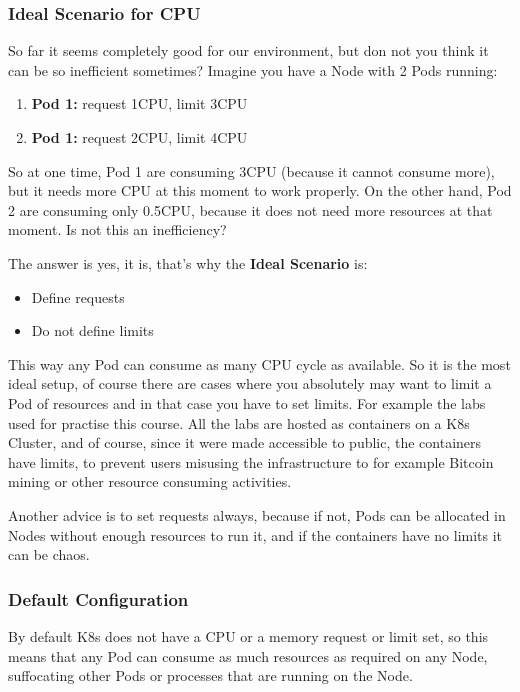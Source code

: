 \documentclass{article}
\begin{document}
\subsubsection{Ideal Scenario for CPU}
So far it seems completely good for our environment, but don not you think it can be so inefficient sometimes? Imagine you have a Node with 2 Pods running:
\begin{enumerate}
    \item \textbf{Pod 1:} request 1CPU, limit 3CPU
    \item \textbf{Pod 1:} request 2CPU, limit 4CPU
\end{enumerate}

So at one time, Pod 1 are consuming 3CPU (because it cannot consume more), but it needs more CPU at this moment to work properly. On the other hand, Pod 2 are consuming only 0.5CPU, because it does not need more resources at that moment. Is not this an inefficiency?

The answer is yes, it is, that's why the \textbf{Ideal Scenario} is:
\begin{itemize}
    \item Define requests
    \item Do not define limits
\end{itemize}

This way any Pod can consume as many CPU cycle as available. So it is the most ideal setup, of course there are cases where you absolutely may want to limit a Pod of resources and in that case you have to set limits. For example the labs used for practise this course. All the labs are hosted as containers on a K8s Cluster, and of course, since it were made accessible to public, the containers have limits, to prevent users misusing the infrastructure to for example Bitcoin mining or other resource consuming activities.

Another advice is to set requests always, because if not, Pods can be allocated in Nodes without enough resources to run it, and if the containers have no limits it can be chaos.


\subsubsection{Default Configuration}

By default K8s does not have a CPU or a memory request or limit set, so this means that any Pod can consume as much resources as required on any Node, suffocating other Pods or processes that are running on the Node.
\end{document}
